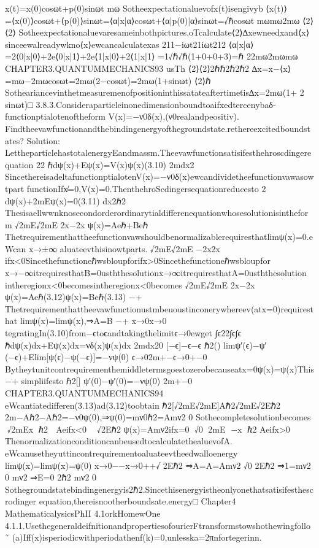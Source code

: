 {x(t)=x(0)cosωt+p(0)sinωt
mω
Sotheexpectationaluevofx(t)isengivyb
⟨x(t)⟩=⟨x(0)⟩cosωt+⟨p(0)⟩sinωt=⟨α|x|α⟩cosωt+⟨α|p(0)|α⟩sinωt=√ℏcosωt
mωmω2mω
⟨2⟩⟨2⟩
Sotheexpectationaluevaresameinbothpictures.oTcalculate⟨2⟩∆xewneedxand⟨x⟩
sinceewalreadywkno⟨x⟩ewcancalculatexas
211−iωt21iωt212
⟨α|x|α⟩=2⟨0|x|0⟩+2e⟨0|x|1⟩+2e⟨1|x|0⟩+2⟨1|x|1⟩
=1√ℏ√ℏ(1+0+0+3)=ℏ
22mω2mωmω
CHAPTER3.QUANTUMMECHANICS93
usTh
⟨2⟩⟨2⟩2ℏℏ2ℏ2ℏ2
∆x=x−⟨x⟩=mω−2mωcosωt=2mω(2−cosωt)=2mω(1+sinωt)
⟨2⟩ℏ
Sotheariancevinthetmeasuremenofpositioninthissatateaftertimetis∆x=2mω(1+
2
sinωt)□
3.8.3.Consideraparticleinonedimensionboundtoaifxedtercenybaδ-functionptialotenoftheform
V(x)=−ν0δ(x),(ν0realandpeositiv).
Findtheevawfunctionandthebindingenergyofthegroundstate.rethereexcitedboundstates?
Solution:
LettheparticlehastotalenergyEandmassm.Theevawfunctionsatisifesthehroscdingerequation
22
ℏdψ(x)+Eψ(x)=V(x)ψ(x)(3.10)
2mdx2
SincethereisadeltafunctionptialotenV(x)=−ν0δ(x)ewcandividetheefunctionvawasowtpart
functionIfx̸=0,V(x)=0.ThenthehroScdingersequationreducesto
2
dψ(x)+2mEψ(x)=0(3.11)
dx2ℏ2
Thesisaellwwnknosecondorderordinarytialdifferenequationwhosesolutionisintheform
√2mE√2mE
2x−2x
ψ(x)=Aeℏ+Beℏ
Thetrequirementhattheefunctionvawshouldbenormalizablerequiresthatlimψ(x)=0.eWcan
x→±∞
aluateevthisinowtparts.
√2mE√2mE
−2x2x
ifx<0Sincethefunctioneℏwsbloupforifx>0Sincethefunctioneℏwsbloupfor
x→−∞itrequiresthatB=0usththesolutionx→∞itrequiresthatA=0usththesolution
intheregionx<0becomesintheregionx<0becomes
√2mE√2mE
2x−2x
ψ(x)=Aeℏ(3.12)ψ(x)=Beℏ(3.13)
−+
Thetrequirementhattheevawfunctionustmbeuoustinconerywhereev(atx=0)requiresthat
limψ(x)=limψ(x),⇒A=B
−+
x→0x→0
tegratingIn(3.10)from−ϵtoϵandtakingthelimitϵ→0ewget
∫ϵ22∫ϵ∫ϵ
ℏdψ(x)dx+Eψ(x)dx=νδ(x)ψ(x)dx
2mdx20
[−ϵ]−ϵ−ϵ
ℏ2()
limψ′(ϵ)−ψ′(−ϵ)+Elim[ψ(ϵ)−ψ(−ϵ)]=−νψ(0)
ϵ→02m+−ϵ→0+−0
Bytheytunitcontrequirementhemiddletermsgoestozerobecauseatx=0ψ(x)=ψ(x)This
−+
simpliifesto
ℏ2[]
ψ′(0)−ψ′(0)=−νψ(0)
2m+−0
CHAPTER3.QUANTUMMECHANICS94
eWcantiatedifferen(3.13)ad(3.12)toobtain
ℏ2[√2mE√2mE]Aℏ2√2mE√2Eℏ2
2m−Aℏ2−Aℏ2=−ν0ψ(0),⇒ψ(0)=mν0ℏ2=Amν2
0
Sothecompletesolutionbecomes
√2mEx
ℏ2

Aeifx<0

√2Eℏ2
ψ(x)=Amν2ifx=0
√0
2mE
−x
ℏ2
Aeifx>0
ThenormalizationconditioncanbeusedtocalculatethealuevofA.
eWcanusetheyuttincontrequirementoaluateevtheedwalloenergy
limψ(x)=limψ(x)=ψ(0)
x→0−−x→0++√
2Eℏ2
⇒A=A=Amν2
√0
2Eℏ2
⇒1=mν2
0
mν2
⇒E=0
2ℏ2
mν2
0
Sothegroundstatebindingenergyis2ℏ2.Sincethisenergyistheonlyonethatsatisifesthescrodinger
equation,thereisnootherboundsate.energy□
Chapter4
MathematicalysicsPhII
4.1orkHomewOne
4.1.1.UsethegeneraldeifnitionandpropertiesofourierFtransformstowshothewingfollo
˜
(a)Iff(x)isperiodicwithperiodathenf(k)=0,unlesska=2πnfortegerinn.
}
